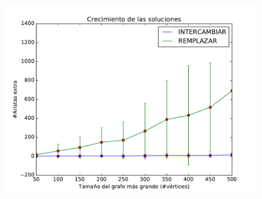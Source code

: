 \begin{figure}[H]
  \centering
  \includegraphics[width=1\textwidth]{graficos/problema_6/crecimiento.pdf} 
  \caption{\footnotesize{}}
  \label{fig:crecimiento}
\end{figure}